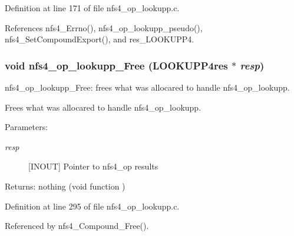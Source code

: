 Definition at line 171 of file nfs4\_\-op\_\-lookupp.c.

References nfs4\_\-Errno(), nfs4\_\-op\_\-lookupp\_\-pseudo(), nfs4\_\-Set\-Compound\-Export(), and res\_\-LOOKUPP4.
\subsubsection{\setlength{\rightskip}{0pt plus 5cm}void nfs4\_\-op\_\-lookupp\_\-Free (LOOKUPP4res $\ast$ {\em resp})}\label{nfs4__op__lookupp_8c_a3}


nfs4\_\-op\_\-lookupp\_\-Free: frees what was allocared to handle nfs4\_\-op\_\-lookupp.

Frees what was allocared to handle nfs4\_\-op\_\-lookupp.

\begin{Desc}
\item[Parameters:]
\begin{description}
\item[{\em resp}][INOUT] Pointer to nfs4\_\-op results\end{description}
\end{Desc}
\begin{Desc}
\item[Returns:]nothing (void function ) \end{Desc}


Definition at line 295 of file nfs4\_\-op\_\-lookupp.c.

Referenced by nfs4\_\-Compound\_\-Free().